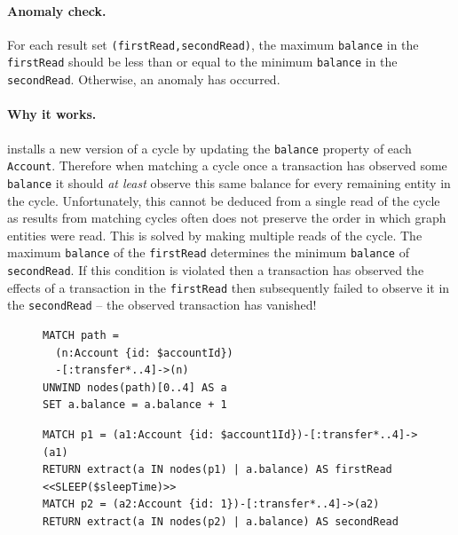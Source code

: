 \paragraph{Anomaly check.}
For each  result set \texttt{(firstRead,secondRead)}, 
the maximum \texttt{balance} in the \texttt{firstRead} should be less than or 
equal to the minimum \texttt{balance} in the \texttt{secondRead}. Otherwise, an 
 anomaly has occurred.

\paragraph{Why it works.}
 installs a new version of a cycle by updating the 
\texttt{balance} property of each \texttt{Account}. Therefore when matching a 
cycle once a transaction has observed some \texttt{balance} it should 
\emph{at least} observe this same balance for every remaining entity in the cycle.
Unfortunately, this cannot be deduced from a single read of the cycle as results
from matching cycles often does not preserve the order in which graph entities 
were read. This is solved by making multiple reads of the cycle. The maximum 
\texttt{balance} of the \texttt{firstRead} determines the minimum 
\texttt{balance} of \texttt{secondRead}. If this condition is violated then a 
transaction has observed the effects of a transaction in the \texttt{firstRead} 
then subsequently failed to observe it in the \texttt{secondRead} -- the 
observed transaction has vanished!

\begin{figure}[htb]
\centering
\begin{minipage}{0.33\linewidth}
\begin{lstlisting}[language=cypher,label=fig:otvfr1,caption=\tx{OTV/FR $T_\mathrm{W}$}.]
MATCH path = 
  (n:Account {id: $accountId})
  -[:transfer*..4]->(n)
UNWIND nodes(path)[0..4] AS a
SET a.balance = a.balance + 1
\end{lstlisting}
\end{minipage}
\quad
\begin{minipage}{0.60\linewidth}
\begin{lstlisting}[language=cypher,label=fig:otvfr2,caption=\tx{OTV/FR $T_\mathrm{R}$}.]
MATCH p1 = (a1:Account {id: $account1Id})-[:transfer*..4]->(a1)
RETURN extract(a IN nodes(p1) | a.balance) AS firstRead
<<SLEEP($sleepTime)>>
MATCH p2 = (a2:Account {id: 1})-[:transfer*..4]->(a2)
RETURN extract(a IN nodes(p2) | a.balance) AS secondRead
\end{lstlisting}
\end{minipage}
\end{figure}


